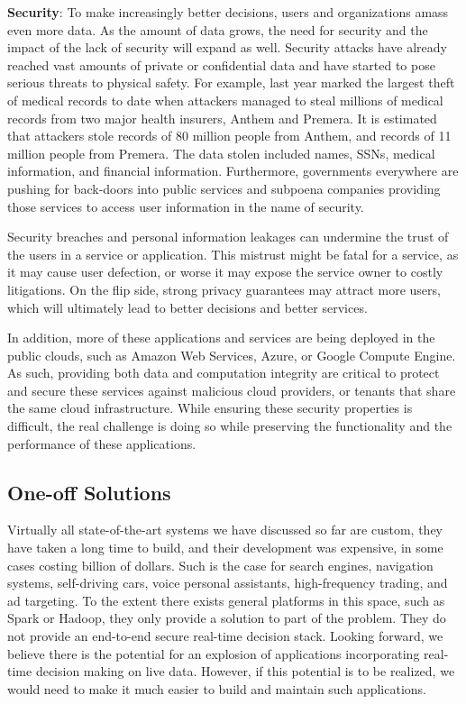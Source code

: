 {\bf Security}: To make increasingly better decisions, users and organizations amass even more data. As the amount of data grows, the need for security and the impact of the lack of security will expand as well. Security attacks have already reached vast amounts of private or confidential data and have started to pose serious threats to physical safety. For example, last year marked the largest theft of medical records to date when attackers managed to steal millions of medical records from two major health insurers, Anthem and Premera. It is estimated that attackers stole records of 80 million people from Anthem, and records of 11 million people from Premera. The data stolen included names, SSNs, medical information, and financial information. Furthermore, governments everywhere are pushing for back-doors into public services and subpoena companies providing those services to access user information in the name of security. 

Security breaches and personal information leakages can undermine the trust of the users in a service or application. This mistrust might be fatal for a service, as it may cause user defection, or worse it may expose the service owner to costly litigations. On the flip side, strong privacy guarantees may attract more users, which will ultimately lead to better decisions and better services. 

In addition, more of these applications and services are being deployed in the public clouds, such as Amazon Web Services, Azure, or Google Compute Engine. As such, providing both data and computation integrity are critical to protect and secure these services against malicious cloud providers, or tenants that share the same cloud infrastructure. While ensuring these security properties is difficult, the real challenge is doing so while preserving the functionality and the performance of these applications.

\subsection{One-off Solutions}

Virtually all state-of-the-art systems we have discussed so far are custom, they have taken a long time to build, and their development was expensive, in some cases costing billion of dollars. Such is the case for search engines, navigation systems, self-driving cars, voice personal assistants, high-frequency trading, and ad targeting. To the extent there exists general platforms in this space, such as Spark or Hadoop, they only provide a solution to part of the problem. They do not  provide an end-to-end secure real-time decision stack. Looking forward, we believe there is the potential for an explosion of applications incorporating real-time decision making on live data. However, if this potential is to be realized, we would need to make it much easier to build and maintain such applications. 
